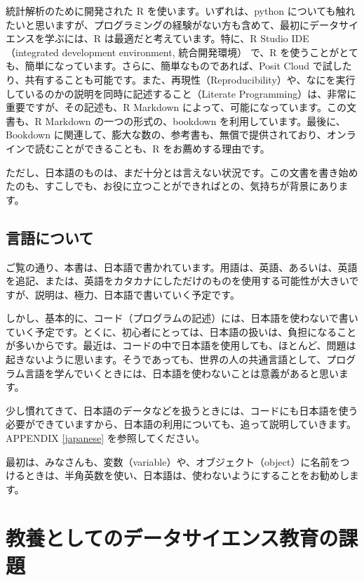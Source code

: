 \documentclass[
]{bxjsbook}
\theoremstyle{definition}
\theoremstyle{definition}
\theoremstyle{definition}
\theoremstyle{definition}
\theoremstyle{remark}
\begin{document}
統計解析のために開発された R を使います。いずれは、python についても触れたいと思いますが、プログラミングの経験がない方も含めて、最初にデータサイエンスを学ぶには、R は最適だと考えています。特に、R Studio IDE（integrated development environment, 統合開発環境） で、R を使うことがとても、簡単になっています。さらに、簡単なものであれば、Posit Cloud で試したり、共有することも可能です。また、再現性（Reproducibility）や、なにを実行しているのかの説明を同時に記述すること（Literate Programming）は、非常に重要ですが、その記述も、R Markdown によって、可能になっています。この文書も、R Markdown の一つの形式の、bookdown を利用しています。最後に、Bookdown に関連して、膨大な数の、参考書も、無償で提供されており、オンラインで読むことができることも、R をお薦めする理由です。

ただし、日本語のものは、まだ十分とは言えない状況です。この文書を書き始めたのも、すこしでも、お役に立つことができればとの、気持ちが背景にあります。

\hypertarget{ux8a00ux8a9eux306bux3064ux3044ux3066}{%
\subsection*{言語について}\label{ux8a00ux8a9eux306bux3064ux3044ux3066}}

ご覧の通り、本書は、日本語で書かれています。用語は、英語、あるいは、英語を追記、または、英語をカタカナにしただけのものを使用する可能性が大きいですが、説明は、極力、日本語で書いていく予定です。

しかし、基本的に、コード（プログラムの記述）には、日本語を使わないで書いていく予定です。とくに、初心者にとっては、日本語の扱いは、負担になることが多いからです。最近は、コードの中で日本語を使用しても、ほとんど、問題は起きないように思います。そうであっても、世界の人の共通言語として、プログラム言語を学んでいくときには、日本語を使わないことは意義があると思います。

少し慣れてきて、日本語のデータなどを扱うときには、コードにも日本語を使う必要ができていますから、日本語の利用についても、追って説明していきます。APPENDIX \ref{japanese} を参照してください。

最初は、みなさんも、変数（variable）や、オブジェクト（object）に名前をつけるときは、半角英数を使い、日本語は、使わないようにすることをお勧めします。

\hypertarget{issues}{%
\section{教養としてのデータサイエンス教育の課題}\label{issues}}
\end{document}
